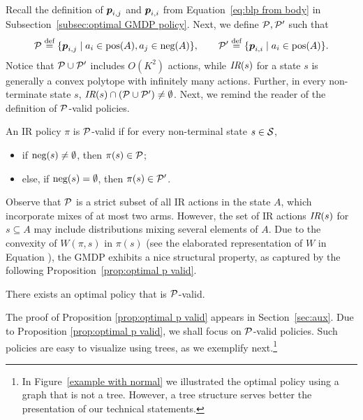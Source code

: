 Recall the definition of $\boldsymbol{ p }_{i,j}$ and $\boldsymbol{ p }_{i,i}$ from Equation~\eqref{eq:blp from body} in Subsection~\ref{subsec:optimal GMDP policy}. Next, we define $\mathcal{P},\mathcal{P}'$ such that
\[
\mathcal{P}\stackrel{\text{def}}{=} \{\boldsymbol{ p }_{i,j}\mid a_i\in \textnormal{pos}(A), a_j\in \textnormal{neg}(A) \}, \qquad \mathcal{P}'\stackrel{\text{def}}{=}\{\boldsymbol{ p }_{i,i}\mid a_i\in \textnormal{pos}(A) \}.
\]
Notice that $\mathcal{P}\cup \mathcal{P}'$ includes $O(K^2)$ actions, while $\textit{IR}(s)$ for a state $s$ is generally a convex polytope  with infinitely many actions. Further, in every non-terminate state $s$, ${\textit{IR}(s) \cap (\mathcal{P} \cup \mathcal{P}') \neq \emptyset}$. Next, we remind the reader of the definition of $\mathcal{P}$-valid policies.
\begin{definition}
An IR policy $\pi$ is $\mathcal{P}$-valid if for every non-terminal state $s\in \mathcal{S}$,
\begin{itemize}
\item if $\textnormal{neg}(s)\neq \emptyset$, then $\pi(s)\in \mathcal{P}$;
\item else, if $\textnormal{neg}(s)= \emptyset$, then $\pi(s)\in \mathcal{P}'$.
\end{itemize} 
\end{definition}
Observe that $\mathcal{P}$ is a strict subset of all IR actions in the state $A$, which incorporate mixes of at most two arms. However, the set of IR actions $\textit{IR}(s)$ for $s\subseteq A$ may include distributions mixing several elements of $A$. Due to the convexity of $W(\pi,s)$ in $\pi(s)$ (see the elaborated representation of $W$ in Equation ), the GMDP exhibits a nice structural property, as captured by the following Proposition~\ref{prop:optimal p valid}. 
\begin{proposition}\label{prop:optimal p valid}
There exists an optimal policy that is $\mathcal{P}$-valid.
\end{proposition}
The proof of Proposition \ref{prop:optimal p valid} appears in Section~\ref{sec:aux}. %
Due to Proposition \ref{prop:optimal p valid}, we shall focus on $\mathcal{P}$-valid policies. Such policies are easy to visualize using trees, as we exemplify next.\footnote{In Figure~\ref{example with normal} we illustrated the optimal policy using a graph that is not a tree. However, a tree structure  serves better the presentation of our technical statements.}
